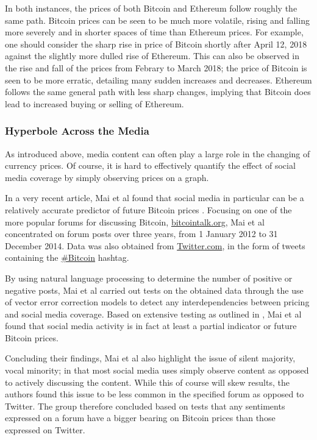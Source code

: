In both instances, the prices of both Bitcoin and Ethereum follow roughly the same path. Bitcoin prices can be seen to be much more volatile, rising and falling more severely and in shorter spaces of time than Ethereum prices. For example, one should consider the sharp rise in price of Bitcoin shortly after April 12, 2018 against the slightly more dulled rise of Ethereum. This can also be observed in the rise and fall of the prices from Febrary to March 2018; the price of Bitcoin is seen to be more erratic, detailing many sudden increases and decreases. Ethereum follows the same general path with less sharp changes, implying that Bitcoin does lead to increased buying or selling of Ethereum. 
  
\subsubsection{Hyperbole Across the Media}
As introduced above, media content can often play a large role in the changing of currency prices. Of course, it is hard to effectively quantify the effect of social media coverage by simply observing prices on a graph.

In a very recent article, Mai et al found that social media in particular can be a relatively accurate predictor of future Bitcoin prices \cite{socmedimpact}. Focusing on one of the more popular forums for discussing Bitcoin, \textcolor{NavyBlue}{\url{bitcointalk.org}}, Mai et al concentrated on forum posts over three years, from 1 January 2012 to 31 December 2014. Data was also obtained from \textcolor{NavyBlue}{\url{Twitter.com}}, in the form of tweets containing the \textcolor{NavyBlue}{\href{https://twitter.com/hashtag/bitcoin?lang=en}{\#Bitcoin}} hashtag.

By using natural language processing to determine the number of positive or negative posts, Mai et al carried out tests on the obtained data through the use of vector error correction models to detect any interdependencies between pricing and social media coverage. Based on extensive testing as outlined in \cite{socmedimpact}, Mai et al found that social media activity is in fact at least a partial indicator or future Bitcoin prices.

Concluding their findings, Mai et al also highlight the issue of silent majority, vocal minority; in that most social media uses simply observe content as opposed to actively discussing the content. While this of course will skew results, the authors found this issue to be less common in the specified forum as opposed to Twitter. The group therefore concluded based on tests that any sentiments expressed on a forum have a bigger bearing on Bitcoin prices than those expressed on Twitter.

